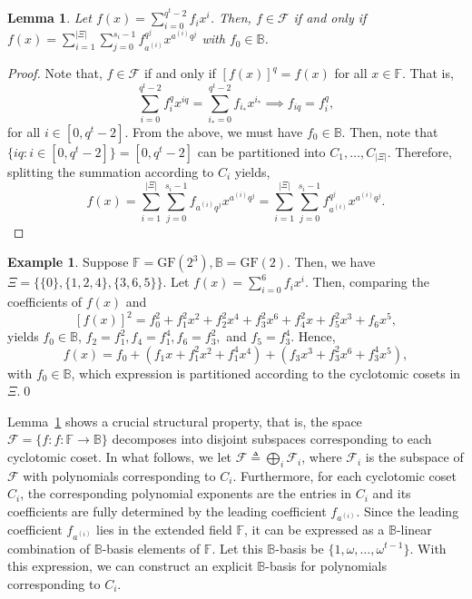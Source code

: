 \documentclass[onecolumn]{IEEEtran}
\theoremstyle{plain}
\newtheorem{lemma}[theorem]{Lemma}
\theoremstyle{definition}
\newtheorem{example}[definition]{Example}
\newcommand{\FF}{\mathbb{F}}
\newcommand{\BB}{\mathbb{B}}
\newcommand{\GF}{{\mathrm{GF}}}
\newcommand{\cF}{\mathcal{F}}
\begin{document}
\begin{lemma}\label{lem:characterizing_f}
Let
$
f(x) = \sum_{i=0}^{q^t-2} f_ix^i
$. Then, $f\in\cF$ if and only if
$f(x) = \sum_{i=1}^{|\Xi|}\sum_{j=0}^{s_i-1}f_{a^{(i)}}^{q^j}x^{a^{(i)}q^j}$ with $f_0\in\BB$.
\end{lemma} 
\begin{proof}
    

Note that, $f\in\cF$ if and only if $[f(x)]^q = f(x)$ for all $x\in\FF$. That is,
$$
\sum_{i=0}^{q^t-2} f_i^q x^{iq} = \sum_{i_*=0}^{q^t-2} f_{i_*}x^{i_*}\implies f_{iq} = f_i^q,
$$
for all $i\in[0,q^t-2]$. From the above, we must have $f_0\in\BB$. Then, note that $\{iq : i\in[0,q^t-2]\} = [0,q^t-2]$ can be partitioned into $C_1,\ldots, C_{|\Xi|}$. Therefore, splitting the summation according to $C_i$ yields,
$$
f(x) = \sum_{i=1}^{|\Xi|}\sum_{j=0}^{s_i-1} f_{a^{(i)}q^j}x^{a^{(i)}q^j} = \sum_{i=1}^{|\Xi|}\sum_{j=0}^{s_i-1} f_{a^{(i)}}^{q^j}x^{a^{(i)}q^j}.
$$
\end{proof}
\begin{example}
    Suppose $\FF = \GF(2^3),\BB = \GF(2)$. Then, we have $\Xi =\{\{0\},\{1,2,4\},\{3,6,5\}\}$. Let $f(x) = \sum_{i=0}^6 f_i x^i$. Then, comparing the coefficients of $f(x)$ and
    $$
    [f(x)]^2 = f_0^2 + f_1^2 x^2 + f_2^2 x^4 + f_3^2 x^6 + f_4^2 x + f_5^2 x^3 + f_6 x^5, 
    $$
    yields $f_0\in\BB$, $f_2 = f_1^2, f_4 = f_1^4, f_6 = f_3^2, $ and $f_5 = f_3^4$. Hence,
    $$
    f(x) = f_0 + (f_1 x + f_1^2 x^2 + f_1^4 x^4) + (f_3 x^3 + f_3^2 x^6 + f_3^4 x^5),
    $$
    with $f_0\in\BB$, which expression is partitioned according to the cyclotomic cosets in $\Xi$.\qed
\end{example}


Lemma~\ref{lem:characterizing_f} shows a crucial structural property, that is, the space $\cF = \{f:f:\FF\to\BB\}$ decomposes into disjoint subspaces corresponding to each cyclotomic coset. In what follows, we let $\cF \triangleq \bigoplus_{i} \cF_i$, where $\cF_i$ is the subspace of $\cF$ with polynomials corresponding to $C_i$. Furthermore, for each cyclotomic coset $C_i$, the corresponding polynomial exponents are the entries in $C_i$ and its coefficients are fully determined by the leading coefficient $f_{a^{(i)}}$. Since the leading coefficient $f_{a^{(i)}}$ lies in the extended field $\FF$, it can be expressed as a $\BB$-linear combination of $\BB$-basis elements of $\FF$. Let this $\BB$-basis be $\{1,\omega,\ldots,\omega^{t-1}\}$. With this expression, we can construct an explicit $\BB$-basis for polynomials corresponding to $C_i$.
\end{document}

